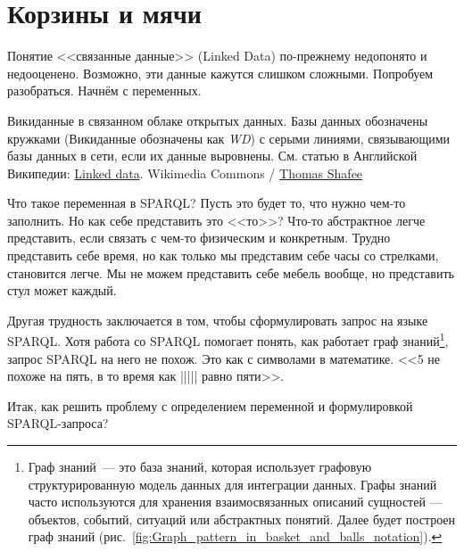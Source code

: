 \chapter{Корзины и мячи}
\label{ch:BucketsAndBalls}


Понятие <<связанные данные>> (Linked Data) по-прежнему недопонято и недооценено. Возможно, эти данные кажутся слишком сложными. 
Попробуем разобраться. Начнём с переменных.

\begin{marginfigure}[0cm]
	{
		\setlength{\fboxsep}{0pt}%
		\setlength{\fboxrule}{1pt}%
	}
    \caption[Викиданные в связанном облаке открытых данных]{Викиданные в связанном облаке открытых данных. Базы данных обозначены кружками (Викиданные обозначены как \textit{WD}) с серыми линиями, связывающими базы данных в сети, если их данные выровнены. См. статью в Английской Википедии: \href{https://en.wikipedia.org/wiki/Linked_data}{Linked data}. Wikimedia Commons / \href{https://commons.wikimedia.org/wiki/File:Wikidata_in_the_Linked_Open_Data_cloud_2020-08-20.svg}{Thomas Shafee}}
	\label{fig:Wikidata_in_linked_open_data}
\end{marginfigure}

Что такое переменная в SPARQL? Пусть это будет то, что нужно чем-то заполнить. Но как себе представить это <<то>>? Что-то абстрактное легче представить, если связать с чем-то физическим и конкретным. Трудно представить себе время, но как только мы представим себе часы со стрелками, становится легче. Мы не можем представить себе мебель вообще, но представить стул может каждый.

Другая трудность заключается в том, чтобы сформулировать запрос на языке SPARQL. Хотя работа со SPARQL помогает понять, как работает граф знаний\footnote[][12pt]{ Граф знаний~--- это база знаний, которая использует графовую структурированную модель данных для интеграции данных. Графы знаний часто используются для хранения взаимосвязанных описаний сущностей — объектов, событий, ситуаций или абстрактных понятий. Далее будет построен граф знаний (рис.~\ref{fig:Graph_pattern_in_basket_and_balls_notation}).}, запрос SPARQL на него не похож. Это как с символами в математике. <<5 не похоже на пять, в то время как ||||| равно пяти>>.

Итак, как решить проблему с определением переменной и формулировкой SPARQL-запроса?

